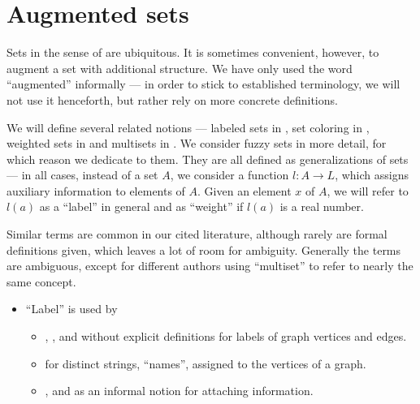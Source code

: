 \section{Augmented sets}\label{sec:augmented_sets}

Sets in the sense of  are ubiquitous. It is sometimes convenient, however, to augment a set with additional structure. We have only used the word \enquote{augmented} informally --- in order to stick to established terminology, we will not use it henceforth, but rather rely on more concrete definitions.

\begin{remark}\label{rem:set_labeling_terminology}
  We will define several related notions --- labeled sets in , set coloring in , weighted sets in  and multisets in . We consider fuzzy sets in more detail, for which reason we dedicate  to them. They are all defined as generalizations of sets --- in all cases, instead of a set \( A \), we consider a function \( l: A \to L \), which assigns auxiliary information to elements of \( A \). Given an element \( x \) of \( A \), we will refer to \( l(a) \) as a \enquote{label} in general and as \enquote{weight} if \( l(a) \) is a real number.

  Similar terms are common in our cited literature, although rarely are formal definitions given, which leaves a lot of room for ambiguity. Generally the terms are ambiguous, except for different authors using \enquote{multiset} to refer to nearly the same concept.

  \begin{itemize}
    \item \enquote{Label} is used by
    \begin{itemize}
      \item {},  ,  and  without explicit definitions for labels of graph vertices and edges.

      \item {} for distinct strings, \enquote{names}, assigned to the vertices of a graph.

      \item {},  and  as an informal notion for attaching information.


\end{itemize}
\end{itemize}
\end{remark}
